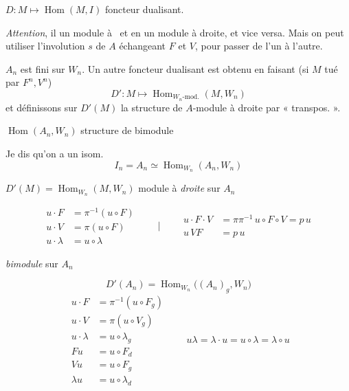 \documentclass[11pt,a4paper]{article}
\begin{document}
$D : M \mapsto \operatorname{Hom}(M, I)$ foncteur dualisant.

\emph{Attention}, il  un module à \ et
 en un module à droite, et vice versa. Mais on peut
utiliser l'involution $s$ de $A$ échangeant $F$ et $V$, pour passer de l'un
à l'autre.

 $A_n$ est fini sur $W_n$. Un autre foncteur dualisant est
obtenu en faisant (si $M$ tué par $F^n, V^n$)
\[
D' : M \mapsto \operatorname{Hom}_{W_n\text{-}\mathrm{mod.}}(M, W_n)
\]
et définissons sur $D'(M)$ la structure de $A$-module à droite par
« transpos. ».

 $\operatorname{Hom}(A_n, W_n)$ structure de
bimodule


Je dis qu'on a un isom.
\[
I_n = A_n \simeq \operatorname{Hom}_{W_n}(A_n, W_n)
\]


$D'(M) = \operatorname{Hom}_{W_n}(M, W_n)$ module à
\emph{droite} sur $A_n$


\[
\begin{aligned}
u \cdot F &= \pi^{-1}(u \circ F) \\
u \cdot V &= \pi(u \circ F) \\
u \cdot \lambda &= u \circ \lambda
\end{aligned}
\qquad\Bigg|\qquad
\begin{aligned}
u \cdot F \cdot V &= \pi\pi^{-1}\, u \circ F \circ V = p\,u \\
u\,VF &= p\,u
\end{aligned}
\]

\emph{bimodule} sur $A_n$

\[
D'(A_n) = \operatorname{Hom}_{W_n}\bigl((A_n)_g, W_n\bigr)
\]
\[
\begin{aligned}
u \cdot F &= \pi^{-1}(u \circ F_g) \\
u \cdot V &= \pi(u \circ V_g) \\
u \cdot \lambda &= u \circ \lambda_g \\
Fu &= u \circ F_d \\
Vu &= u \circ F_g \\
\lambda u &= u \circ \lambda_d
\end{aligned}
\qquad
u\lambda = \lambda \cdot u = u \circ \lambda = \lambda \circ u
\]
\end{document}
